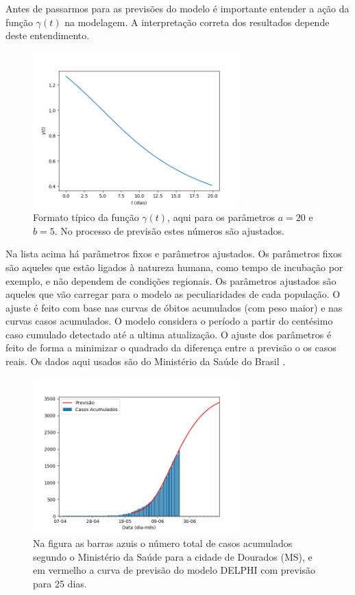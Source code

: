 \documentclass[12pt]{article}
\begin{document}
Antes de passarmos para as previsões do modelo é importante entender a ação da função $\gamma(t)$ na modelagem. A interpretação correta dos resultados depende deste entendimento.
\begin{figure}[t]
\centering
\includegraphics[width = 8cm]{figs/gamma_1.png}
 \caption{Formato típico da função $\gamma (t)$, aqui para os parâmetros $a = 20$ e $b = 5$. No processo de previsão estes números são ajustados.}
 \label{gamma}
\end{figure}


Na lista acima há parâmetros fixos e parâmetros ajustados. Os parâmetros fixos são aqueles que estão ligados à natureza humana, como tempo de incubação por exemplo, e não dependem de condições regionais. Os parâmetros ajustados são aqueles que vão carregar para o modelo as peculiaridades de cada população. O ajuste é feito com base nas curvas de óbitos acumulados (com peso maior) e nas curvas casos acumulados. O modelo considera o período a partir do centésimo caso cumulado detectado até a ultima atualização. O ajuste dos parâmetros é feito de forma a minimizar o quadrado da diferença entre a previsão o os casos reais. Os dados aqui usados são do Ministério da Saúde do Brasil \cite{minsaude}.  

\begin{figure}[t]
 \centering
 \includegraphics[width = 8cm]{figs/Fig_Brasil_MS_Dourados_casos_20200624_025dias.jpg}
 \caption{Na figura as barras azuis o número total de casos acumulados segundo o Ministério da Saúde para a cidade de Dourados (MS), e em vermelho a curva de previsão do modelo DELPHI com previsão para 25 dias.}
 \label{proj_casos}
\end{figure}
\end{document}
